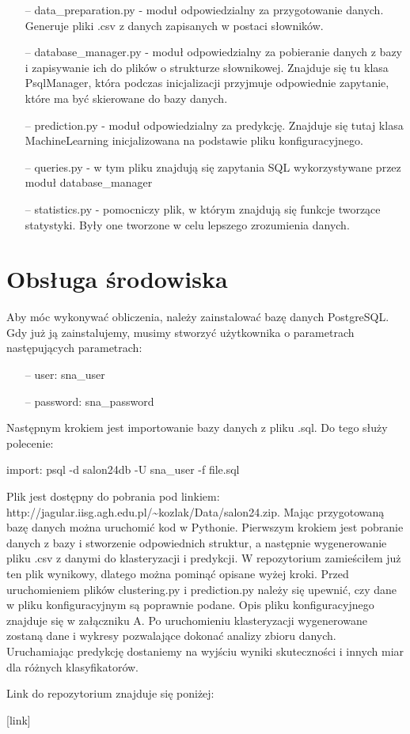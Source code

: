 \documentclass[polish,12pt]{aghthesis}
\begin{document}
\begin{itemize}
    \item[--] data\_preparation.py - moduł odpowiedzialny za przygotowanie danych. Generuje pliki .csv z danych zapisanych w postaci słowników.
    \item[--] database\_manager.py - moduł odpowiedzialny za pobieranie danych z bazy i zapisywanie ich do plików o strukturze słownikowej. Znajduje się tu klasa PsqlManager, która podczas inicjalizacji przyjmuje odpowiednie zapytanie, które ma być skierowane do bazy danych.
    \item[--] prediction.py - moduł odpowiedzialny za predykcję. Znajduje się tutaj klasa MachineLearning inicjalizowana na podstawie pliku konfiguracyjnego.
    \item[--] queries.py - w tym pliku znajdują się zapytania SQL wykorzystywane przez moduł database\_manager
    \item[--] statistics.py - pomocniczy plik, w którym znajdują się funkcje tworzące statystyki. Były one tworzone w celu lepszego zrozumienia danych.
\end{itemize}


\section{Obsługa środowiska}

Aby móc wykonywać obliczenia, należy zainstalować bazę danych PostgreSQL. Gdy już ją zainstalujemy, musimy stworzyć użytkownika o parametrach następujących parametrach:
\begin{itemize}
    \item[--] user: sna\_user
    \item[--] password: sna\_password
\end{itemize}
Następnym krokiem jest importowanie bazy danych z pliku .sql. Do tego służy polecenie: 

\vspace{5mm}
import: psql -d salon24db -U sna\_user -f file.sql
\vspace{5mm}

Plik jest dostępny do pobrania pod linkiem: http://jagular.iisg.agh.edu.pl/\textasciitilde kozlak/Data/salon24.zip. Mając przygotowaną bazę danych można uruchomić kod w Pythonie. Pierwszym krokiem jest pobranie danych z bazy i stworzenie odpowiednich struktur, a następnie wygenerowanie pliku .csv z danymi do klasteryzacji i predykcji. W repozytorium zamieściłem już ten plik wynikowy, dlatego można pominąć opisane wyżej kroki. Przed uruchomieniem plików clustering.py i prediction.py należy się upewnić, czy dane w pliku konfiguracyjnym są poprawnie podane. Opis pliku konfiguracyjnego znajduje się w załączniku A. Po uruchomieniu klasteryzacji wygenerowane zostaną dane i wykresy pozwalające dokonać analizy zbioru danych. Uruchamiając predykcję dostaniemy na wyjściu wyniki skuteczności i innych miar dla różnych klasyfikatorów.

Link do repozytorium znajduje się poniżej:

[link]
\end{document}
